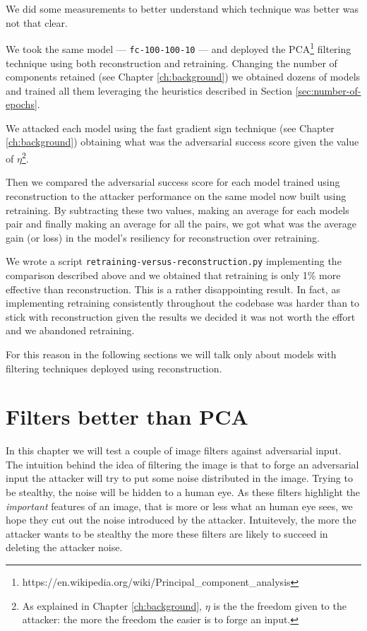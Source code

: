 We did some measurements to better understand which technique was
better was not that clear.

We took the same model --- \texttt{fc-100-100-10} --- and deployed the
PCA\footnote{https://en.wikipedia.org/wiki/Principal\_component\_analysis}
filtering technique using both reconstruction and retraining. Changing
the number of components retained (see Chapter \ref{ch:background}) we
obtained dozens of models and trained all them leveraging the
heuristics described in Section
\ref{sec:number-of-epochs}.

We attacked each model using the fast gradient sign technique (see
Chapter \ref{ch:background}) obtaining what was the adversarial success
score given the value of $\eta$\footnote{As explained in Chapter
  \ref{ch:background}, $\eta$ is the the freedom given to the attacker:
  the more the freedom the easier is to forge an input.}.

Then we compared the adversarial success score for each model trained
using reconstruction to the attacker performance on the same model now
built using retraining. By subtracting these two values, making an
average for each models pair and finally making an average for all the
pairs, we got what was the average gain (or loss) in the model's
resiliency for reconstruction over retraining.

We wrote a script \texttt{retraining-versus-reconstruction.py}
implementing the comparison described above and we obtained that
retraining is only 1\% more effective than reconstruction. This is a
rather disappointing result. In fact, as implementing retraining
consistently throughout the codebase was harder than to stick with
reconstruction given the results we decided it was not worth the effort
and we abandoned retraining.

For this reason in the following sections we will talk only about models
with filtering techniques deployed using reconstruction.

\section{Filters better than PCA}

In this chapter we will test a couple of image filters against
adversarial input. The intuition behind the idea of filtering the image
is that to forge an adversarial input the attacker will try to put some
noise distributed in the image. Trying to be stealthy, the noise will be
hidden to a human eye. As these filters highlight the \emph{important}
features of an image, that is more or less what an human eye sees, we
hope they cut out the noise introduced by the attacker. Intuitevely,
the more the attacker wants to be stealthy the more these filters are
likely to succeed in deleting the attacker noise.

